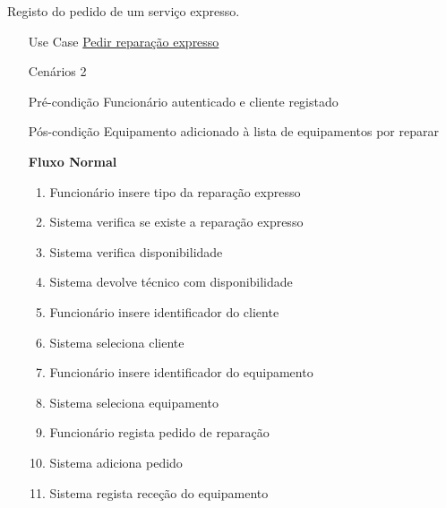 \documentclass[../relatorio.tex]{subfiles}
\begin{document}
Registo do pedido de um serviço expresso.
\begin{itemize}
    \item[Use Case] {\underline{Pedir reparação expresso}}
    \item[Cenários] {2}
    \item[Pré-condição] {Funcionário autenticado e cliente registado}
    \item[Pós-condição] {Equipamento adicionado à lista de equipamentos por reparar}
          \begin{flushleft}
              \textbf{Fluxo Normal}
          \end{flushleft}
          \begin{enumerate}
              \item Funcionário insere tipo da reparação expresso 
              \item Sistema verifica se existe a reparação expresso
              \item Sistema verifica disponibilidade
              \item Sistema devolve técnico com disponibilidade
              \item Funcionário insere identificador do cliente
              \item Sistema seleciona cliente
              \item Funcionário insere identificador do equipamento
              \item Sistema seleciona equipamento
              \item Funcionário regista pedido de reparação
              \item Sistema adiciona pedido
              \item Sistema regista receção do equipamento
          \end{enumerate}


\end{itemize}
\end{document}
